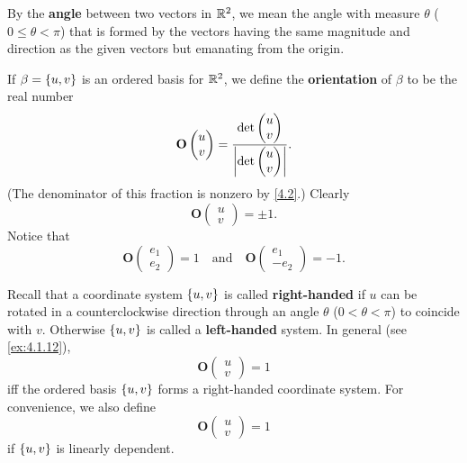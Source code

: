 \begin{defn}\label{4.1.2}
  By the \textbf{angle} between two vectors in \(\mathbb{R}^2\), we mean the angle with measure \(\theta\) (\(0 \leq \theta < \pi\)) that is formed by the vectors having the same magnitude and direction as the given vectors but emanating from the origin.

  If \(\beta = \left\lbrace u, v\right\rbrace\) is an ordered basis for \(\mathbb{R}^2\), we define the \textbf{orientation} of \(\beta\) to be the real number
  \[
    \mathbf{O}\begin{pmatrix}
      u \\
      v
    \end{pmatrix} = \dfrac{\det\begin{pmatrix}
        u \\
        v
      \end{pmatrix}}{\left\lvert\det\begin{pmatrix}
          u \\
          v
        \end{pmatrix}\right\rvert}.
  \]
  (The denominator of this fraction is nonzero by \cref{4.2}.)
  Clearly
  \[
    \mathbf{O}\begin{pmatrix}
      u \\
      v
    \end{pmatrix} = \pm 1.
  \]
  Notice that
  \[
    \mathbf{O}\begin{pmatrix}
      e_1 \\
      e_2
    \end{pmatrix} = 1 \quad \text{and} \quad \mathbf{O}\begin{pmatrix}
      e_1 \\
      -e_2
    \end{pmatrix} = -1.
  \]

  Recall that a coordinate system \(\left\lbrace u, v\right\rbrace\) is called \textbf{right-handed} if \(u\) can be rotated in a counterclockwise direction through an angle \(\theta\) (\(0 < \theta < \pi\)) to coincide with \(v\).
  Otherwise \(\left\lbrace u, v\right\rbrace\) is called a \textbf{left-handed} system.
  In general (see \cref{ex:4.1.12}),
  \[
    \mathbf{O}\begin{pmatrix}
      u \\
      v
    \end{pmatrix} = 1
  \]
  iff the ordered basis \(\left\lbrace u, v\right\rbrace\) forms a right-handed coordinate system.
  For convenience, we also define
  \[
    \mathbf{O}\begin{pmatrix}
      u \\
      v
    \end{pmatrix} = 1
  \]
  if \(\left\lbrace u, v\right\rbrace\) is linearly dependent.
\end{defn}

